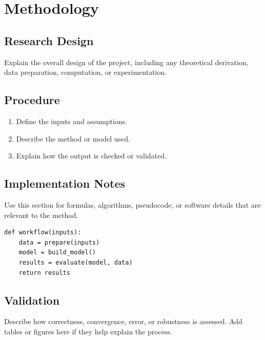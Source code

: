 \chapter{Methodology}

\section{Research Design}

Explain the overall design of the project, including any theoretical derivation, data preparation, computation, or experimentation.

\section{Procedure}

\begin{enumerate}
    \item Define the inputs and assumptions.
    \item Describe the method or model used.
    \item Explain how the output is checked or validated.
\end{enumerate}

\section{Implementation Notes}

Use this section for formulas, algorithms, pseudocode, or software details that are relevant to the method.

\begin{lstlisting}[caption={Template for a workflow or algorithm}, label={lst:workflow-template}]
def workflow(inputs):
    data = prepare(inputs)
    model = build_model()
    results = evaluate(model, data)
    return results
\end{lstlisting}

\section{Validation}

Describe how correctness, convergence, error, or robustness is assessed. Add tables or figures here if they help explain the process.
